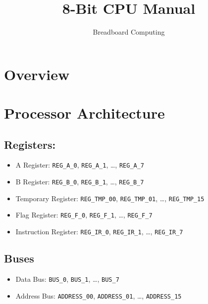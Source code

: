 \documentclass[a4paper]{article}
\title{8-Bit CPU Manual}
\author{Breadboard Computing}
\date{}
\begin{document}
\maketitle


\pagebreak

\tableofcontents

\pagebreak

\section{Overview}

\pagebreak

\section{Processor Architecture}

\subsection{Registers:}
\begin{itemize}
    \item A Register: \texttt{REG\_A\_0}, \texttt{REG\_A\_1}, \dots, \texttt{REG\_A\_7}
    \item B Register: \texttt{REG\_B\_0}, \texttt{REG\_B\_1}, \dots, \texttt{REG\_B\_7}
    \item Temporary Register: \texttt{REG\_TMP\_00}, \texttt{REG\_TMP\_01}, \dots, \texttt{REG\_TMP\_15}
    \item Flag Register:  \texttt{REG\_F\_0}, \texttt{REG\_F\_1}, \dots, \texttt{REG\_F\_7}
    \item Instruction Register: \texttt{REG\_IR\_0}, \texttt{REG\_IR\_1}, \dots, \texttt{REG\_IR\_7}
\end{itemize}

\subsection{Buses}
\begin{itemize}
    \item Data Bus: \texttt{BUS\_0}, \texttt{BUS\_1}, \dots, \texttt{BUS\_7}
    \item Address Bus: \texttt{ADDRESS\_00}, \texttt{ADDRESS\_01}, \dots, \texttt{ADDRESS\_15}
\end{itemize}
\end{document}
